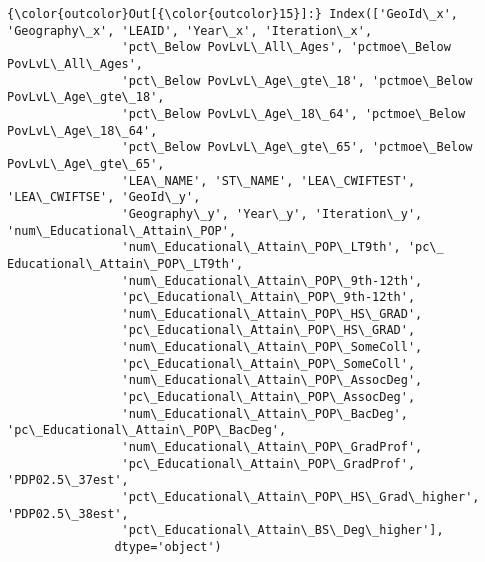 \documentclass[11pt]{article}
\begin{document}
\begin{Verbatim}[commandchars=\\\{\}]
{\color{outcolor}Out[{\color{outcolor}15}]:} Index(['GeoId\_x', 'Geography\_x', 'LEAID', 'Year\_x', 'Iteration\_x',
                'pct\_Below PovLvL\_All\_Ages', 'pctmoe\_Below PovLvL\_All\_Ages',
                'pct\_Below PovLvL\_Age\_gte\_18', 'pctmoe\_Below PovLvL\_Age\_gte\_18',
                'pct\_Below PovLvL\_Age\_18\_64', 'pctmoe\_Below PovLvL\_Age\_18\_64',
                'pct\_Below PovLvL\_Age\_gte\_65', 'pctmoe\_Below PovLvL\_Age\_gte\_65',
                'LEA\_NAME', 'ST\_NAME', 'LEA\_CWIFTEST', 'LEA\_CWIFTSE', 'GeoId\_y',
                'Geography\_y', 'Year\_y', 'Iteration\_y', 'num\_Educational\_Attain\_POP',
                'num\_Educational\_Attain\_POP\_LT9th', 'pc\_ Educational\_Attain\_POP\_LT9th',
                'num\_Educational\_Attain\_POP\_9th-12th',
                'pc\_Educational\_Attain\_POP\_9th-12th',
                'num\_Educational\_Attain\_POP\_HS\_GRAD',
                'pc\_Educational\_Attain\_POP\_HS\_GRAD',
                'num\_Educational\_Attain\_POP\_SomeColl',
                'pc\_Educational\_Attain\_POP\_SomeColl',
                'num\_Educational\_Attain\_POP\_AssocDeg',
                'pc\_Educational\_Attain\_POP\_AssocDeg',
                'num\_Educational\_Attain\_POP\_BacDeg', 'pc\_Educational\_Attain\_POP\_BacDeg',
                'num\_Educational\_Attain\_POP\_GradProf',
                'pc\_Educational\_Attain\_POP\_GradProf', 'PDP02.5\_37est',
                'pct\_Educational\_Attain\_POP\_HS\_Grad\_higher', 'PDP02.5\_38est',
                'pct\_Educational\_Attain\_BS\_Deg\_higher'],
               dtype='object')
\end{Verbatim}
            
\end{document}
